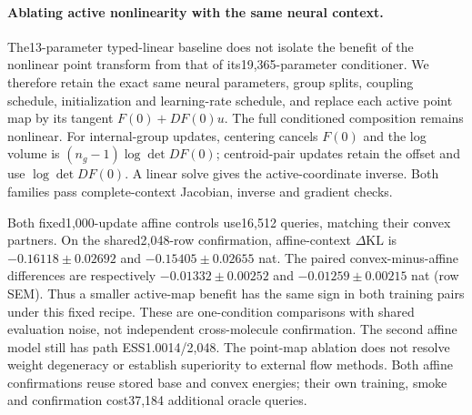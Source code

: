 \paragraph{Ablating active nonlinearity with the same neural context.}
The13-parameter typed-linear baseline does not isolate the benefit of the
nonlinear point transform from that of its19,365-parameter conditioner.
We therefore retain the exact same neural parameters, group splits, coupling
schedule, initialization and learning-rate schedule, and replace each active
point map by its tangent $F(0)+DF(0)u$. The full conditioned composition remains
nonlinear. For internal-group updates, centering cancels $F(0)$ and the
log volume is $(n_g-1)\log\det DF(0)$; centroid-pair updates retain the offset
and use $\log\det DF(0)$. A linear solve gives the active-coordinate inverse.
Both families pass complete-context Jacobian, inverse and gradient checks.

Both fixed1,000-update affine controls use16,512 queries, matching their
convex partners. On the shared2,048-row confirmation, affine-context
$\Delta\mathrm{KL}$ is $-0.16118\pm0.02692$ and $-0.15405\pm0.02655$ nat.
The paired convex-minus-affine differences are respectively
$-0.01332\pm0.00252$ and $-0.01259\pm0.00215$ nat (row SEM).
Thus a smaller active-map benefit has the same sign in both training pairs
under this fixed recipe. These are one-condition comparisons with shared
evaluation noise, not independent cross-molecule confirmation. The second
affine model still has path ESS1.0014/2,048. The point-map ablation does not
resolve weight degeneracy or establish superiority to external flow methods.
Both affine confirmations reuse stored base and convex energies; their own
training, smoke and confirmation cost37,184 additional oracle queries.
